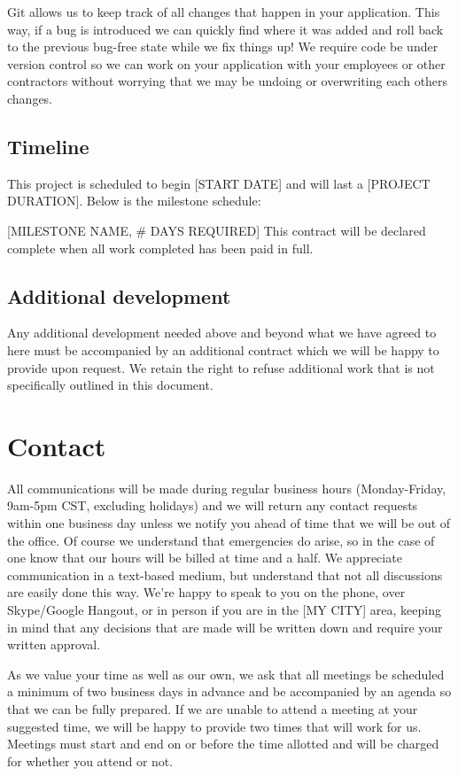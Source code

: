 \documentclass[10pt,a4paper,parskip]{scrartcl}
\begin{document}
Git allows us to keep track of all changes that happen in your application.
This way, if a bug is introduced we can quickly find where it was added and
roll back to the previous bug-free state while we fix things up! We require
code be under version control so we can work on your application with your
employees or other contractors without worrying that we may be undoing or
overwriting each others changes.

\subsection{Timeline}

This project is scheduled to begin [START DATE] and will last a [PROJECT DURATION].
Below is the milestone schedule:

[MILESTONE NAME, \# DAYS REQUIRED]
This contract will be declared complete when all work completed has been paid in full.

\subsection{Additional development}

Any additional development needed above and beyond what we have agreed to here
must be accompanied by an additional contract which we will be happy to provide
upon request. We retain the right to refuse additional work that is not
specifically outlined in this document.

\section{Contact}

All communications will be made during regular business hours (Monday-Friday,
9am-5pm CST, excluding holidays) and we will return any contact requests within
one business day unless we notify you ahead of time that we will be out of the
office. Of course we understand that emergencies do arise, so in the case of
one know that our hours will be billed at time and a half. We appreciate
communication in a text-based medium, but understand that not all discussions
are easily done this way. We’re happy to speak to you on the phone, over
Skype/Google Hangout, or in person if you are in the [MY CITY] area, keeping in
mind that any decisions that are made will be written down and require your
written approval.

As we value your time as well as our own, we ask that all meetings be scheduled
a minimum of two business days in advance and be accompanied by an agenda so
that we can be fully prepared. If we are unable to attend a meeting at your
suggested time, we will be happy to provide two times that will work for us.
Meetings must start and end on or before the time allotted and will be charged
for whether you attend or not.
\end{document}
